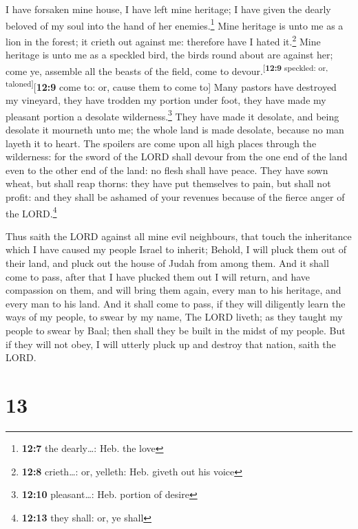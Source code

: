  I have forsaken mine house, I have left mine heritage; I
have given the dearly beloved of my soul into the hand of her
enemies.\footnote{\textbf{12:7} the dearly\ldots: Heb. the love}
 Mine heritage is unto me as a lion in the forest; it
crieth out against me: therefore have I hated it.\footnote{\textbf{12:8}
  crieth\ldots: or, yelleth: Heb. giveth out his voice} 
Mine heritage is unto me as a speckled bird, the birds round about are
against her; come ye, assemble all the beasts of the field, come to
devour.\textsuperscript{{[}\textbf{12:9} speckled: or,
taloned{]}}{[}\textbf{12:9} come to: or, cause them to come to{]}
 Many pastors have destroyed my vineyard, they have
trodden my portion under foot, they have made my pleasant portion a
desolate wilderness.\footnote{\textbf{12:10} pleasant\ldots: Heb.
  portion of desire}  They have made it desolate, and
being desolate it mourneth unto me; the whole land is made desolate,
because no man layeth it to heart.  The spoilers are come
upon all high places through the wilderness: for the sword of the LORD
shall devour from the one end of the land even to the other end of the
land: no flesh shall have peace.  They have sown wheat,
but shall reap thorns: they have put themselves to pain, but shall not
profit: and they shall be ashamed of your revenues because of the fierce
anger of the LORD.\footnote{\textbf{12:13} they shall: or, ye shall}

 Thus saith the LORD against all mine evil neighbours,
that touch the inheritance which I have caused my people Israel to
inherit; Behold, I will pluck them out of their land, and pluck out the
house of Judah from among them.  And it shall come to
pass, after that I have plucked them out I will return, and have
compassion on them, and will bring them again, every man to his
heritage, and every man to his land.  And it shall come
to pass, if they will diligently learn the ways of my people, to swear
by my name, The LORD liveth; as they taught my people to swear by Baal;
then shall they be built in the midst of my people.  But
if they will not obey, I will utterly pluck up and destroy that nation,
saith the LORD.

\hypertarget{section-12}{%
\section{13}\label{section-12}}

